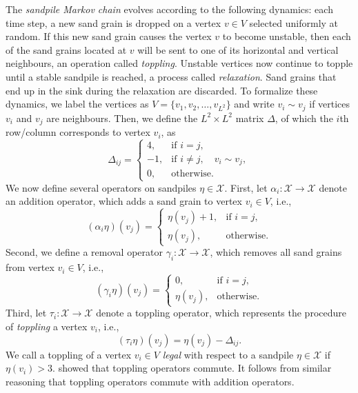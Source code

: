 \documentclass{article}
\begin{document}
The \textit{sandpile Markov chain} evolves according to the following dynamics: each time step, a new sand grain is dropped on a vertex $v \in V$ selected uniformly at random. If this new sand grain causes the vertex $v$ to become unstable, then each of the sand grains located at $v$ will be sent to one of its horizontal and vertical neighbours, an operation called \textit{toppling}. Unstable vertices now continue to topple until a stable sandpile is reached, a process called \textit{relaxation}. Sand grains that end up in the sink during the relaxation are discarded. To formalize these dynamics, we label the vertices as $V = \{v_1, v_2, \ldots, v_{L^2}\}$ and write $v_i \sim v_j$ if vertices $v_i$ and $v_j$ are neighbours. Then, we define the $L^2 \times L^2$ matrix $\Delta$, of which the $i$th row/column corresponds to vertex $v_i$, as 
\begin{equation*}
    \Delta_{ij} = \begin{cases}
        4, &\text{if } i = j, \\
        -1, &\text{if } i \neq j, \quad v_i \sim v_j, \\
        0, &\text{otherwise.}
    \end{cases}
\end{equation*}
We now define several operators on sandpiles $\eta \in \mathcal{X}$. 
First, let $\alpha_i: \mathcal{X} \rightarrow \mathcal{X}$ denote an addition operator, which adds a sand grain to vertex $v_i \in V$, i.e.,
    \begin{equation*}
        (\alpha_i \eta)(v_j) = \begin{cases}
            \eta(v_j) + 1, &\text{if } i = j, \\
            \eta(v_j), &\text{otherwise}.
        \end{cases}
    \end{equation*}
Second, we define a removal operator $\gamma_i: \mathcal{X} \rightarrow \mathcal{X}$, which removes all sand grains from vertex $v_i \in V$, i.e.,
    \begin{equation*}
        (\gamma_i \eta)(v_j) = \begin{cases}
            0, &\text{if } i = j, \\
            \eta(v_j), &\text{otherwise.}
        \end{cases}
    \end{equation*}
Third, let $\tau_i: \mathcal{X} \rightarrow \mathcal{X}$ denote a toppling operator, which represents the procedure of \textit{toppling} a vertex $v_i$, i.e.,
    \begin{equation*}
        (\tau_i \eta)(v_j) = \eta(v_j) - \Delta_{ij}.
    \end{equation*}
    We call a toppling of a vertex $v_i \in V$ \textit{legal} with respect to a sandpile $\eta \in \mathcal{X}$ if $\eta(v_i) > 3$. \citet{Dhar} showed that toppling operators commute. It follows from similar reasoning that toppling operators commute with addition operators. 
    
\end{document}
